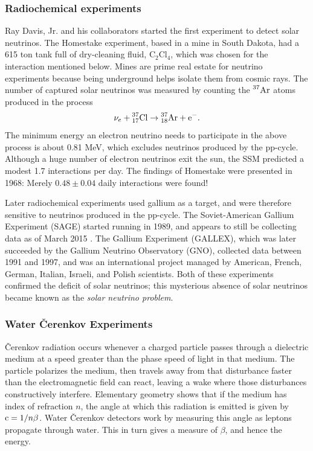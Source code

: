 \subsubsection{Radiochemical experiments}
Ray Davis, Jr. and his collaborators started the first experiment to detect
solar neutrinos. The Homestake experiment, based in a mine in South Dakota,
had a 615 ton tank full of dry-cleaning fluid, $\text{C}_2\text{Cl}_4$,
which was chosen for the interaction mentioned below.
Mines are prime real estate for neutrino experiments because being underground
helps isolate them from cosmic rays. The number of captured solar neutrinos
was measured by counting the $\prescript{37}{}{\text{Ar}}$ atoms produced in
the process
\begin{equation}
  \nu_e+\prescript{37}{17}{\text{Cl}}\to
        \prescript{37}{18}{\text{Ar}}+\text{e}^-.
\end{equation}
The minimum energy an electron neutrino needs to participate in the above
process is about 0.81 MeV, which excludes neutrinos produced by the pp-cycle.
Although a huge number of electron neutrinos exit the sun, the SSM
predicted a modest 1.7 interactions per day. The findings
of Homestake were presented in 1968: Merely $0.48\pm0.04$ daily interactions
were found!

Later radiochemical experiments used gallium as a target, and were therefore
sensitive to neutrinos produced in the pp-cycle. The Soviet-American
Gallium Experiment (SAGE) started running in 1989, and appears to still be
collecting data as of March 2015 \cite{G1}. The Gallium Experiment (GALLEX),
which was later succeeded by the Gallium Neutrino Observatory (GNO),
collected data between 1991 and 1997, and was an international project
managed by American, French, German, Italian, Israeli, and Polish scientists.
Both of these experiments confirmed the deficit of solar neutrinos; this
mysterious absence of solar neutrinos became known as the {\it solar
neutrino problem}.

\subsubsection{Water \v{C}erenkov Experiments}
\v{C}erenkov radiation occurs whenever a charged particle passes through a
dielectric medium at a speed greater than the phase speed of light in that
medium. The particle polarizes the medium, then travels away from that
disturbance faster than the electromagnetic field can react, leaving
a wake where those disturbances constructively interfere. Elementary
geometry shows that if the medium has index of refraction $n$, the angle
at which this radiation is emitted is given by $\operatorname{c}=1/n\beta$. Water
\v{C}erenkov detectors work by measuring this angle as leptons propagate
through water. This in turn gives a measure of $\beta$, and hence the energy.

